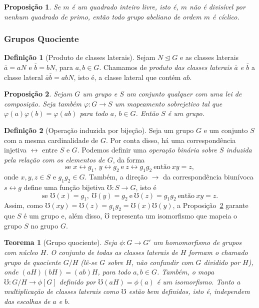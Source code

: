 \documentclass[a4paper,12pt]{report}
\theoremstyle{plain}
\newtheorem{teorema}{Teorema}[section]
\newtheorem{proposicao}{Proposição}[section]
\theoremstyle{definition}
\newtheorem{definicao}{Definição}[section]
\begin{document}
	\begin{proposicao}
		Se $m$ é um \emph{quadrado inteiro livre}, isto é, $m$ não é divisível por nenhum quadrado de primo, então todo grupo abeliano de ordem $m$ é cíclico.
	\end{proposicao}
	
	\subsubsection{Grupos Quociente}
	
	\begin{definicao}[Produto de classes laterais] Sejam $N\trianglelefteq G$ e as classes laterais \(\bar a = aN\) e \(\bar b = bN\), para $a,b \in G$. Chamamos de \emph{produto das classes laterais \(\bar a\) e \(\bar b\)} a classe lateral \(\bar a \bar b = abN\), isto é, a classe lateral que contém \(ab\).	
	\end{definicao}
	
	
	\begin{proposicao}\label{prop:grupoInduzidoPorOutro}
		Sejam \(G\) um grupo e \(S\) um conjunto qualquer
		com uma lei de composição. Seja também \(\varphi:G\longrightarrow S\) um
		mapeamento sobrejetivo tal que \(\varphi(a)\varphi(b) = \varphi(ab)\)
		para todo \(a\), \(b\in G\). Então \(S\) é um grupo.	
	\end{proposicao}
	
	\begin{definicao}[Operação induzida por bijeção]
		Seja um grupo $G$ e um conjunto $S$ com a mesma cardinalidade de $G$. Por conta disso, há uma correspondência injetiva $\leftrightarrow$ entre $S$ e $G$. Podemos definir uma \emph{operação binária sobre $S$ induzida pela relação com os elementos de $G$}, da forma
		$$\text{se }x\leftrightarrow g_1,\ y\leftrightarrow g_2\ \text{e}\ z\leftrightarrow g_1g_2\ \text{então} \ xy = z,$$ onde $x,y,z\in S$ e $g_1g_2\in G$. Também, a direção $\rightarrow$ da correspondência biunívoca $s\leftrightarrow g$ define uma função bijetiva $\mho: S \longrightarrow G$, isto é
		$$\text{se }\mho(x) = g_1,\ \mho(y) = g_2\ \text{e}\ \mho(z)= g_1g_2\ \text{então} \ xy = z.$$
		Assim, como $\mho(xy) =\mho(z) = g_1g_2 = \mho(x)\mho(y)$, a Proposição~\ref{prop:grupoInduzidoPorOutro} garante que $S$ é um grupo e, além disso, $\mho$ representa um isomorfismo que mapeia o grupo $S$ no grupo $G$.
	\end{definicao}
	
	\begin{teorema}[Grupo quociente]
		Seja $\phi: G \longrightarrow G'$ um homomorfismo de grupos com núcleo $H$. O conjunto de todas as classes laterais de $H$ formam o chamado \emph{grupo de quociente} $G/H$ (lê-se $G$ sobre $H$, não confundir com $G$ dividido por $H$), onde $(aH)(bH) = (ab)H$, para todo $a,b \in G$. Também, o mapa $\mho: G/H \longrightarrow \phi[G]$ definido por $\mho(aH) = \phi(a)$ é um isomorfismo. Tanto a multiplicação de classes laterais como $\mho$ estão bem definidos, isto é, independem das escolhas de $a$ e $b$.
	\end{teorema}
	
\end{document}
